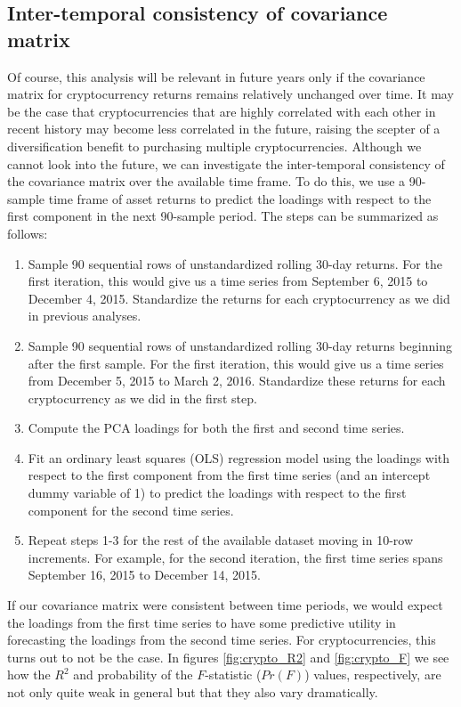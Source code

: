 \documentclass[12pt,twoside]{article}
\begin{document}
\subsection{Inter-temporal consistency of covariance matrix}

Of course, this analysis will be relevant in future years only if the covariance matrix for cryptocurrency returns remains relatively unchanged over time. It may be the case that cryptocurrencies that are highly correlated with each other in recent history may become less correlated in the future, raising the scepter of a diversification benefit to purchasing multiple cryptocurrencies. Although we cannot look into the future, we can investigate the inter-temporal consistency of the covariance matrix over the available time frame. To do this, we use a 90-sample time frame of asset returns to predict the loadings with respect to the first component in the next 90-sample period. The steps can be summarized as follows:

\begin{enumerate}
	\item Sample 90 sequential rows of unstandardized rolling 30-day returns. For the first iteration, this would give us a time series from September 6, 2015 to December 4, 2015. Standardize the returns for each cryptocurrency as we did in previous analyses.
	\item Sample 90 sequential rows of unstandardized rolling 30-day returns beginning after the first sample. For the first iteration, this would give us a time series from December 5, 2015 to March 2, 2016. Standardize these returns for each cryptocurrency as we did in the first step.
	\item Compute the PCA loadings for both the first and second time series.
	\item Fit an ordinary least squares (OLS) regression model using the loadings with respect to the first component from the first time series (and an intercept dummy variable of 1) to predict the loadings with respect to the first component for the second time series.
	\item Repeat steps 1-3 for the rest of the available dataset moving in 10-row increments. For example, for the second iteration, the first time series spans September 16, 2015 to December 14, 2015.
\end{enumerate}

If our covariance matrix were consistent between time periods, we would expect the loadings from the first time series to have some predictive utility in forecasting the loadings from the second time series. For cryptocurrencies, this turns out to not be the case. In figures \ref{fig:crypto_R2} and \ref{fig:crypto_F} we see how the $R^2$ and probability of the $F$-statistic ($Pr(F)$) values, respectively, are not only quite weak in general but that they also vary dramatically.
\end{document}
